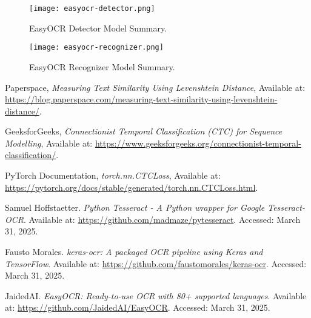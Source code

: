 \documentclass[9pt]{osa-supplemental-document}
\begin{document}
\begin{figure}[h]
  \centering
  \begin{minipage}[b]{0.55\textwidth}
    \texttt{[image: easyocr-detector.png]}
    \caption{EasyOCR Detector Model Summary.}
  \end{minipage}
  \hfill
  \begin{minipage}[b]{0.55\textwidth}
    \texttt{[image: easyocr-recognizer.png]}
    \caption{EasyOCR Recognizer Model Summary.}
  \end{minipage}
\end{figure}


\newpage
\begin{thebibliography}{9}

Paperspace,
\textit{Measuring Text Similarity Using Levenshtein Distance},
Available at: \url{https://blog.paperspace.com/measuring-text-similarity-using-levenshtein-distance/}.

GeeksforGeeks,
\textit{Connectionist Temporal Classification (CTC) for Sequence Modelling},
Available at: \url{https://www.geeksforgeeks.org/connectionist-temporal-classification/}.

PyTorch Documentation,
\textit{torch.nn.CTCLoss},
Available at: \url{https://pytorch.org/docs/stable/generated/torch.nn.CTCLoss.html}.

Samuel Hoffstaetter. \textit{Python Tesseract - A Python wrapper for Google Tesseract-OCR}. Available at: \url{https://github.com/madmaze/pytesseract}. Accessed: March 31, 2025.

Fausto Morales.
\textit{keras-ocr: A packaged OCR pipeline using Keras and TensorFlow}.
Available at: \url{https://github.com/faustomorales/keras-ocr}.
Accessed: March 31, 2025.

JaidedAI.
\textit{EasyOCR: Ready-to-use OCR with 80+ supported languages}.
Available at: \url{https://github.com/JaidedAI/EasyOCR}.
Accessed: March 31, 2025.
\end{thebibliography}
\end{document}
